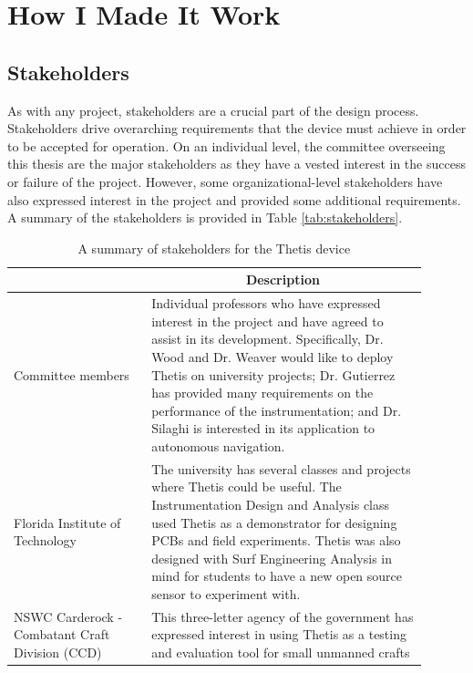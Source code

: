 \chapter{How I Made It Work} 

\section{Stakeholders} 
As with any project, stakeholders are a crucial part of the design process.
Stakeholders drive overarching requirements that the device must achieve in order to be accepted for operation.
On an individual level, the committee overseeing this thesis are the major stakeholders as they have a vested interest in the success or failure of the project.
However, some organizational-level stakeholders have also expressed interest in the project and provided some additional requirements.
A summary of the stakeholders is provided in Table \ref{tab:stakeholders}.

\begin{table}
	\caption{A summary of stakeholders for the Thetis device}
	\centering
	\begin{tabular}{|p{0.3\linewidth} | p{0.6\linewidth}|}
		\hline
		\rowcolor[gray]{0.8}
		\multicolumn{1}{|c|}{\textbf{Stakeholder}} & \multicolumn{1}{|c|}{\textbf{Description}} \\
		\hline
		Committee members & Individual professors who have expressed interest in the project and have agreed to assist in its development. Specifically, Dr. Wood and Dr. Weaver would like to deploy Thetis on university projects; Dr. Gutierrez has provided many requirements on the performance of the instrumentation; and Dr. Silaghi is interested in its application to autonomous navigation. \\
		\hline
		Florida Institute of \newline Technology & The university has several classes and projects where Thetis could be useful. The Instrumentation Design and Analysis class used Thetis as a demonstrator for designing PCBs and field experiments. Thetis was also designed with Surf Engineering Analysis in mind for students to have a new open source sensor to experiment with. \\
		\hline
		NSWC Carderock - \newline Combatant Craft Division (CCD) & This three-letter agency of the government has expressed interest in using Thetis as a testing and evaluation tool for small unmanned crafts \\
		\hline
	\end{tabular}
\end{table}

